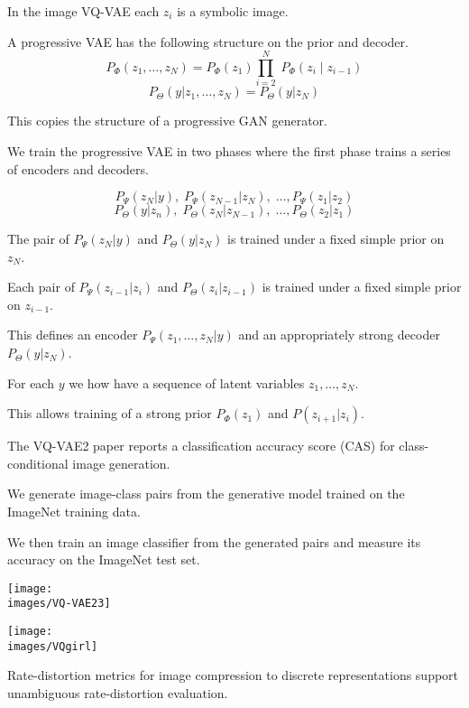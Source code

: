 {\vfill
In the image VQ-VAE each $z_i$ is a symbolic image.

\vfill
A progressive VAE has the following structure on the prior and decoder.
$$P_\Phi(z_1,\ldots,z_N) = P_\Phi(z_1)\prod_{i=2}^N\;P_\Phi(z_i\;|\;z_{i-1})$$
$$P_\Theta(y|z_1,\ldots,z_N) = P_\Theta(y|z_N)$$

\vfill
This copies the structure of a progressive GAN generator.


{\huge
We train the progressive VAE in two phases where the first phase trains a series of encoders and decoders.

$$P_\Psi(z_N|y),\;P_\Psi(z_{N-1}|z_N), \;\ldots, P_\Psi(z_1|z_2)$$
$$P_\Theta(y|z_n),\;P_\Theta(z_N|z_{N-1}),\;\ldots,P_\Theta(z_2|z_1)$$

\vfill
The pair of $P_\Psi(z_N|y)$ and $P_\Theta(y|z_N)$ is trained under a fixed simple prior on $z_N$.

Each pair of $P_\Psi(z_{i-1}|z_i)$ and $P_\Theta(z_i|z_{i-1})$ is trained under a fixed simple prior on $z_{i-1}$.

This defines an encoder $P_\Psi(z_1,\ldots,z_N|y)$ and an appropriately strong decoder $P_\Theta(y|z_N)$.
}


For each $y$ we how have a sequence of latent variables $z_1,\ldots,z_N$.

\vfill
This allows training of a strong prior $P_\Phi(z_1)$ and $P(z_{i+1}|z_i)$.


The VQ-VAE2 paper reports a classification accuracy score (CAS) for class-conditional image generation.

\vfill
We generate image-class pairs from the generative model trained on the ImageNet training data.

\vfill
We then train an image classifier from the generated pairs and measure its accuracy on the ImageNet test set.

\vfill
\centerline{\texttt{[image: \\images/VQ-VAE23]}}


\vfill
\centerline{\texttt{[image: \\images/VQgirl]}}


Rate-distortion metrics for image compression to discrete representations support unambiguous rate-distortion evaluation.

}
